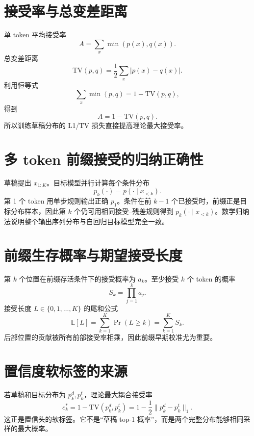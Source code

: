 \documentclass[UTF8,12pt,a4paper,fontset=none]{ctexart}
\numberwithin{equation}{section}
\newcommand{\E}{\mathbb{E}}
\begin{document}
\section{接受率与总变差距离}
单 token 平均接受率
\begin{equation}
 A=\sum_x\min(p(x),q(x)).
\end{equation}
总变差距离
\begin{equation}
 \mathrm{TV}(p,q)=\frac12\sum_x|p(x)-q(x)|.
\end{equation}
利用恒等式
\begin{equation}
 \sum_x\min(p,q)=1-\mathrm{TV}(p,q),
\end{equation}
得到
\begin{equation}
 \boxed{A=1-\mathrm{TV}(p,q).}
\end{equation}
所以训练草稿分布的 L1/TV 损失直接提高理论最大接受率。

\section{多 token 前缀接受的归纳正确性}
草稿提出 $x_{1:K}$。目标模型并行计算每个条件分布
\begin{equation}
 p_k(\cdot)=p(\cdot\mid x_{<k}).
\end{equation}
第 1 个 token 用单步规则输出正确 $p_1$。条件在前 $k-1$ 个已接受时，前缀正是目标分布样本，因此第 $k$ 个仍可用相同接受--残差规则得到 $p_k(\cdot\mid x_{<k})$。数学归纳法说明整个输出序列分布与自回归目标模型完全一致。

\section{前缀生存概率与期望接受长度}
第 $k$ 个位置在前缀存活条件下的接受概率为 $a_k$。至少接受 $k$ 个 token 的概率
\begin{equation}
 S_k=\prod_{j=1}^{k}a_j.
\end{equation}
接受长度 $L\in\{0,1,\ldots,K\}$ 的尾和公式
\begin{equation}
 \E[L]=\sum_{k=1}^{K}\Pr(L\ge k)
 =\sum_{k=1}^{K}S_k.
\end{equation}
后部位置的贡献被所有前部接受率相乘，因此前缀早期校准尤为重要。

\section{置信度软标签的来源}
若草稿和目标分布为 $p_k^d,p_k^t$，理论最大耦合接受率
\begin{equation}
 c_k^*=1-\mathrm{TV}(p_k^d,p_k^t)
 =1-\frac12\|p_k^d-p_k^t\|_1.
\end{equation}
这正是置信头的软标签。它不是“草稿 top-1 概率”，而是两个完整分布能够相同采样的最大概率。
\end{document}
